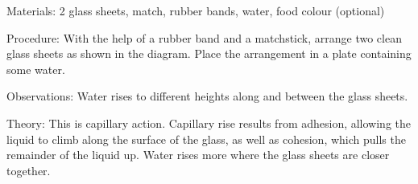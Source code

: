 \begin{multicols}{2}
\begin{description*}
\item[Materials:]{2 glass sheets, match, rubber bands, water, food colour (optional)}
\item[Procedure:]{With the help of a rubber band and a matchstick, arrange two clean glass sheets as shown
in the diagram. Place the arrangement in a plate containing some water.}
\item[Observations:]{Water rises to different heights along and between the glass sheets. }
\item[Theory:]{This is capillary
action. Capillary rise results from adhesion, allowing the liquid to climb along the surface of the glass, as well as cohesion, which pulls the remainder of the liquid up. Water rises more where the glass sheets are closer together.}
\end{description*}


\end{multicols}
